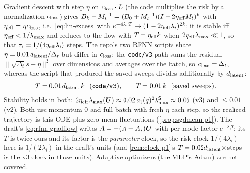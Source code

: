\begin{remark}\label{rem:lin-gd}
Gradient descent with step $\eta$ on $c_{\rm loss}\cdot L$ (the code multiplies the risk by a normalization $c_{\rm loss}$) gives $B_k+M_t^{-1}=(B_0+M_t^{-1})(I-2\eta_{\rm eff}M_t)^k$ with $\eta_{\rm eff}=\eta c_{\rm loss}$, i.e.\ \eqref{eq:lin-excess} with $e^{-4\lambda_iT}\to(1-2\eta_{\rm eff}\lambda_i)^{2k}$; it is stable iff $\eta_{\rm eff}<1/\lambda_{\max}$ and reduces to the flow with $T=\eta_{\rm eff}k$ when $2\eta_{\rm eff}\lambda_{\max}\ll1$, so that $\tau_i=1/(4\eta_{\rm eff}\lambda_i)$ steps. The repo's two RFNN scripts share $\eta=0.01\,d_{\mathrm{latent}}/\Delta_t$ but differ in $c_{\rm loss}$: the \texttt{code/v3} path sums the residual $\|\sqrt{\Delta_t}s+\eta\|^2$ over dimensions and averages over the batch, so $c_{\rm loss}=\Delta_t$, whereas the script that produced the saved sweeps divides additionally by $d_{\mathrm{latent}}$:
\begin{equation}\label{eq:lin-steps}
T=0.01\,d_{\mathrm{latent}}\,k\ \ (\texttt{code/v3}),\qquad T=0.01\,k\ \ (\text{saved sweeps}).
\end{equation}
Stability holds in both: $2\eta_{\rm eff}\lambda_{\max}(\bm{U})\approx0.02\,a_1(q)^2\lambda^{\mathsf S}_{\max}\approx0.05$ (v3) and $\le0.01$ (v2). Both use momentum $0$ and full batch with fresh $\eta$ each step, so the realized trajectory is this ODE plus zero-mean fluctuations (\cref{prop:sgdmean-p1}). The draft's \eqref{eq:rfnn-gradflow} writes $\dot A=-(A-A_\star)\bm{U}$ with per-mode factor $e^{-\lambda_iT}$: its $T$ is twice ours and its factor is the \emph{parameter} clock, so the risk clock $1/(4\lambda_i)$ here is $1/(2\lambda_i)$ in the draft's units (and \cref{rem:clock-p1}'s $T=0.02d_{\mathrm{latent}}\times$steps is the v3 clock in those units). Adaptive optimizers (the MLP's Adam) are not covered.
\end{remark}

